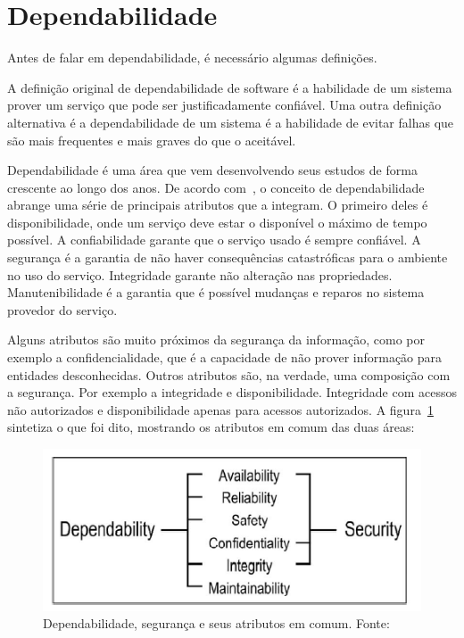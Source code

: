 \section{Dependabilidade}


Antes de falar em dependabilidade, é necessário algumas definições.

A definição original de dependabilidade de software é a habilidade de um sistema prover um serviço que pode ser justificadamente confiável. Uma outra definição alternativa é a dependabilidade de um sistema é a habilidade de evitar falhas que são mais frequentes e mais graves do que o aceitável.

Dependabilidade é uma área que vem desenvolvendo seus estudos de forma crescente ao longo dos anos. De acordo com~\cite{algirdas04}, o conceito de dependabilidade abrange uma série de principais atributos que a integram. O primeiro deles é disponibilidade, onde um serviço deve estar o disponível o máximo de tempo possível. A confiabilidade garante que o serviço usado é sempre confiável. A segurança é a garantia de não haver consequências catastróficas para o ambiente no uso do serviço. Integridade garante não alteração nas propriedades. Manutenibilidade é a garantia que é possível mudanças e reparos no sistema provedor do serviço.

Alguns atributos são muito próximos da segurança da informação, como por exemplo a confidencialidade, que é a capacidade de não prover informação para entidades desconhecidas. Outros atributos são, na verdade, uma composição com a segurança. Por exemplo a integridade e disponibilidade. Integridade com acessos não autorizados e disponibilidade apenas para acessos autorizados. A figura~\ref{fig:dependabilidade-seguranca} sintetiza o que foi dito, mostrando os atributos em comum das duas áreas:

\begin{figure}
	\includegraphics[scale=0.75]{images/dependabilidade-seguranca.png}
	\caption{Dependabilidade, segurança e seus atributos em comum. Fonte:~\cite{algirdas04}}
	\label{fig:dependabilidade-seguranca}
\end{figure}

